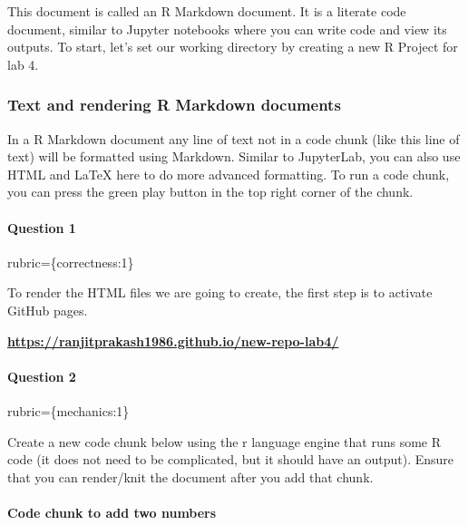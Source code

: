 \documentclass[
]{article}
\begin{document}
This document is called an R Markdown document. It is a literate code
document, similar to Jupyter notebooks where you can write code and view
its outputs. To start, let's set our working directory by creating a new
R Project for lab 4.

\hypertarget{text-and-rendering-r-markdown-documents}{%
\subsubsection{Text and rendering R Markdown
documents}\label{text-and-rendering-r-markdown-documents}}

In a R Markdown document any line of text not in a code chunk (like this
line of text) will be formatted using Markdown. Similar to JupyterLab,
you can also use HTML and LaTeX here to do more advanced formatting. To
run a code chunk, you can press the green play button in the top right
corner of the chunk.

\begin{alert alert-info}
\hypertarget{question-1}{%
\paragraph{Question 1}\label{question-1}}

rubric=\{correctness:1\}

To render the HTML files we are going to create, the first step is to
activate GitHub pages.
\end{alert alert-info}

\href{https://ranjitprakash1986.github.io/new-repo-lab4/}{\textbf{https://ranjitprakash1986.github.io/new-repo-lab4/}}

\begin{alert alert-info}
\hypertarget{question-2}{%
\paragraph{Question 2}\label{question-2}}

rubric=\{mechanics:1\}

Create a new code chunk below using the r language engine that runs some
R code (it does not need to be complicated, but it should have an
output). Ensure that you can render/knit the document after you add that
chunk.
\end{alert alert-info}

\hypertarget{code-chunk-to-add-two-numbers}{%
\paragraph{Code chunk to add two
numbers}\label{code-chunk-to-add-two-numbers}}
\end{document}
